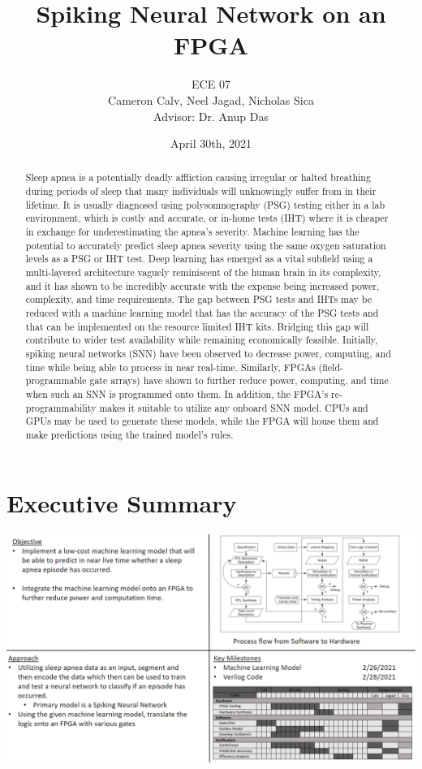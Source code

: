 \documentclass[12pt,titlepage]{article}
\title{Spiking Neural Network on an FPGA}
\author{ECE 07\\{\small{Cameron Calv, Neel Jagad, Nicholas Sica}}\\{\small{Advisor: Dr. Anup Das}}}
\date{April 30th, 2021}
\begin{document}
\maketitle
\newpage
\clearpage
{}

\begin{abstract}
Sleep apnea is a potentially deadly affliction causing irregular or halted breathing during
	periods of sleep that many individuals will unknowingly suffer from in their lifetime. It 
	is usually diagnosed using polysomnography (PSG) testing either in a lab environment, which
	is costly and accurate, or in-home tests (IHT) where it is cheaper in exchange for underestimating
	the apnea’s severity. Machine learning has the potential to accurately predict sleep apnea severity
	using the same oxygen saturation levels as a PSG or IHT test. Deep learning has emerged as a vital
	subfield using a multi-layered architecture vaguely reminiscent of the human brain in its complexity,
	and it has shown to be incredibly accurate with the expense being increased power, complexity, and
	time requirements. The gap between PSG tests and IHTs may be reduced with a machine learning model
	that has the accuracy of the PSG tests and that can be implemented on the resource limited IHT kits.
	Bridging this gap will contribute to wider test availability while remaining economically feasible.
	Initially, spiking neural networks (SNN) have been observed to decrease power, computing, and time
	while being able to process in near real-time. Similarly, FPGAs (field-programmable gate arrays)
	have shown to further reduce power, computing, and time when such an SNN is programmed onto them. 
	In addition, the FPGA’s re-programmability makes it suitable to utilize any onboard SNN model. CPUs 
	and GPUs may be used to generate these models, while the FPGA will house them and make predictions 
	using the trained model’s rules. 
\end{abstract}

\tableofcontents

\listoffigures

\listoftables

\newpage

\section{Executive Summary}
\begin{table}[H]
	\label{tbl:quadchart}
	\includegraphics[width=\linewidth]{quadchart.png}
\end{table}
\end{document}
